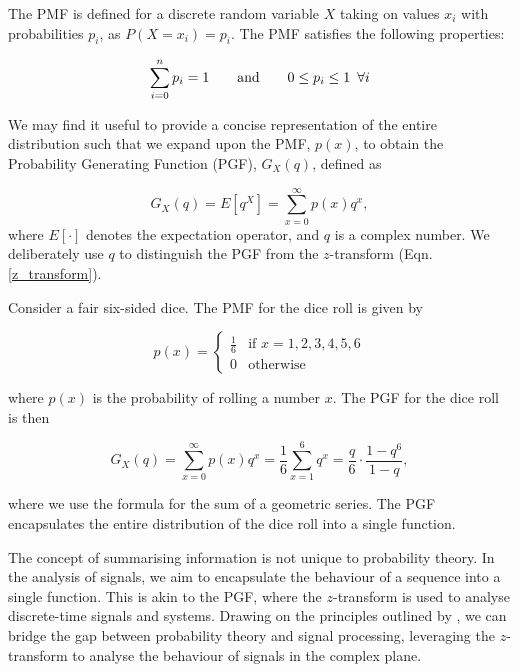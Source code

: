 \documentclass[a4paper]{report}
\begin{document}
The PMF is defined for a discrete random variable $X$ taking on values $x_i$ with probabilities $p_i$, as $P(X=x_i) = p_i$. The PMF satisfies the following properties:

\begin{equation}
    \sum_{i=0}^n p_i = 1 \hspace{2em}\text{and}\hspace{2em} 0 \leq p_i \leq 1 \hspace{0.5em}\forall i
\end{equation}

We may find it useful to provide a concise representation of the entire distribution such that we expand upon the PMF, $p(x)$, to obtain the Probability Generating Function (PGF), $G_X(q)$, defined as

\begin{equation}
	G_X(q) = E[q^X] = \sum^{\infty}_{x = 0} p(x)q^x,
\end{equation}
where $E[\cdot]$ denotes the expectation operator, and $q$ is a complex number. We deliberately use $q$ to distinguish the PGF from the $z$-transform (Eqn. \ref{z_transform}).

\begin{example}
    Consider a fair six-sided dice. The PMF for the dice roll is given by
    
    \begin{equation}
        p(x) = \begin{cases}
            \frac{1}{6} & \text{if } x = 1, 2, 3, 4, 5, 6 \\
            0 & \text{otherwise}
        \end{cases}
    \end{equation}

    where $p(x)$ is the probability of rolling a number $x$. The PGF for the dice roll is then

    \begin{equation}
        G_X(q) = \sum^{\infty}_{x = 0} p(x)q^x = \frac{1}{6} \sum^6_{x = 1} q^x = \frac{q}{6}\cdot \frac{1-q^6}{1-q},
    \end{equation}

    where we use the formula for the sum of a geometric series. The PGF encapsulates the entire distribution of the dice roll into a single function.
\end{example}

The concept of summarising information is not unique to probability theory. In the analysis of signals, we aim to encapsulate the behaviour of a sequence into a single function. This is akin to the PGF, where the $z$-transform is used to analyse discrete-time signals and systems. Drawing on the principles outlined by \citet{ross2014introduction}, we can bridge the gap between probability theory and signal processing, leveraging the $z$-transform to analyse the behaviour of signals in the complex plane.
\end{document}
